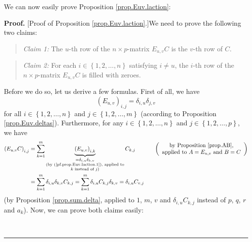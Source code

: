 \documentclass[numbers=enddot,12pt,final,onecolumn,notitlepage]{scrartcl}%
\theoremstyle{definition}
\newenvironment{statement}{\begin{quote}}{\end{quote}}
\newenvironment{proof}[1][Proof]{\noindent\textbf{#1.} }{\ \rule{0.5em}{0.5em}}
\let\sumnonlimits\sum
\renewcommand{\sum}{\sumnonlimits\limits}
\begin{document}
We can now easily prove Proposition \ref{prop.Euv.laction}:

\begin{proof}
[Proof of Proposition \ref{prop.Euv.laction}.]We need to prove the following
two claims:

\begin{statement}
\textit{Claim 1:} The $u$-th row of the $n\times p$-matrix $E_{u,v}C$ is the
$v$-th row of $C$.
\end{statement}

\begin{statement}
\textit{Claim 2:} For each $i\in\left\{  1,2,\ldots,n\right\}  $ satisfying
$i\neq u$, the $i$-th row of the $n\times p$-matrix $E_{u,v}C$ is filled with zeroes.
\end{statement}

Before we do so, let us derive a few formulas. First of all, we have%
\begin{equation}
\left(  E_{u,v}\right)  _{i,j}=\delta_{i,u}\delta_{j,v}
\label{pf.prop.Euv.laction.1}%
\end{equation}
for all $i\in\left\{  1,2,\ldots,n\right\}  $ and $j\in\left\{  1,2,\ldots
,m\right\}  $ (according to Proposition \ref{prop.Euv.deltas}). Furthermore,
for any $i\in\left\{  1,2,\ldots,n\right\}  $ and $j\in\left\{  1,2,\ldots
,p\right\}  $, we have%
\begin{align}
\left(  E_{u,v}C\right)  _{i,j}  &  =\sum_{k=1}^{m}\underbrace{\left(
E_{u,v}\right)  _{i,k}}_{\substack{=\delta_{i,u}\delta_{k,v}\\\text{(by
(\ref{pf.prop.Euv.laction.1}), applied to}\\k\text{ instead of }j\text{)}%
}}C_{k,j}\ \ \ \ \ \ \ \ \ \ \left(
\begin{array}
[c]{c}%
\text{by Proposition \ref{prop.AB},}\\
\text{applied to }A=E_{u,v}\text{ and }B=C
\end{array}
\right) \nonumber\\
&  =\sum_{k=1}^{m}\delta_{i,u}\delta_{k,v}C_{k,j}=\sum_{k=1}^{m}\delta
_{i,u}C_{k,j}\delta_{k,v}=\delta_{i,u}C_{v,j} \label{pf.prop.Euv.laction.2}%
\end{align}
(by Proposition \ref{prop.sum.delta}, applied to $1$, $m$, $v$ and
$\delta_{i,u}C_{k,j}$ instead of $p$, $q$, $r$ and $a_{k}$). Now, we can prove
both claims easily:


\end{proof}
\end{document}
